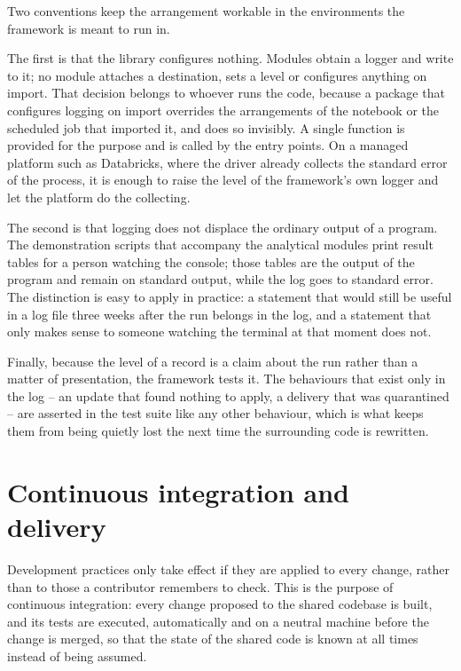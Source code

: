 \documentclass[a4paper, 11pt]{report}
\begin{document}
Two conventions keep the arrangement workable in the environments the framework is meant to run in.

The first is that the library configures nothing. Modules obtain a logger and write to it; no module attaches a destination, sets a level or configures anything on import. That decision belongs to whoever runs the code, because a package that configures logging on import overrides the arrangements of the notebook or the scheduled job that imported it, and does so invisibly. A single function is provided for the purpose and is called by the entry points. On a managed platform such as Databricks, where the driver already collects the standard error of the process, it is enough to raise the level of the framework's own logger and let the platform do the collecting.

The second is that logging does not displace the ordinary output of a program. The demonstration scripts that accompany the analytical modules print result tables for a person watching the console; those tables are the output of the program and remain on standard output, while the log goes to standard error. The distinction is easy to apply in practice: a statement that would still be useful in a log file three weeks after the run belongs in the log, and a statement that only makes sense to someone watching the terminal at that moment does not.

Finally, because the level of a record is a claim about the run rather than a matter of presentation, the framework tests it. The behaviours that exist only in the log -- an update that found nothing to apply, a delivery that was quarantined -- are asserted in the test suite like any other behaviour, which is what keeps them from being quietly lost the next time the surrounding code is rewritten.

\section{Continuous integration and delivery}

Development practices only take effect if they are applied to every change, rather than to those a contributor remembers to check. This is the purpose of continuous integration: every change proposed to the shared codebase is built, and its tests are executed, automatically and on a neutral machine before the change is merged, so that the state of the shared code is known at all times instead of being assumed.
\end{document}
